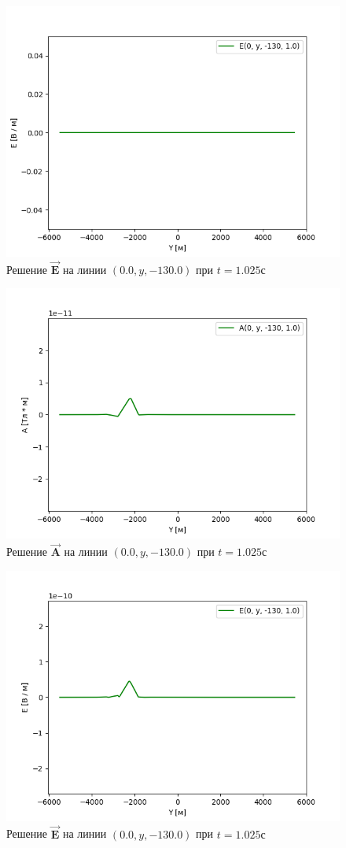\begin{figure}
	\centering
	\includegraphics[width=0.5\linewidth]{images/Normal_E_obj2_1.png}
	\caption{Решение $\overrightarrow{\textbf{E}}$ на линии $(0.0, y, -130.0)$ при $t = 1.025с$}
	\label{fig:E_2line_t0}
\end{figure} 

\begin{figure}
	\centering
	\includegraphics[width=0.5\linewidth]{images/Normal_A_obj2_2.png}
	\caption{Решение $\overrightarrow{\textbf{A}}$ на линии $(0.0, y, -130.0)$ при $t = 1.025с$}
	\label{fig:A_2line_t1}
\end{figure} 

\begin{figure}
	\centering
	\includegraphics[width=0.5\linewidth]{images/Normal_E_obj2_2.png}
	\caption{Решение $\overrightarrow{\textbf{E}}$ на линии $(0.0, y, -130.0)$  при $t = 1.025с$}
	\label{fig:E_2line_t1}
\end{figure} 

